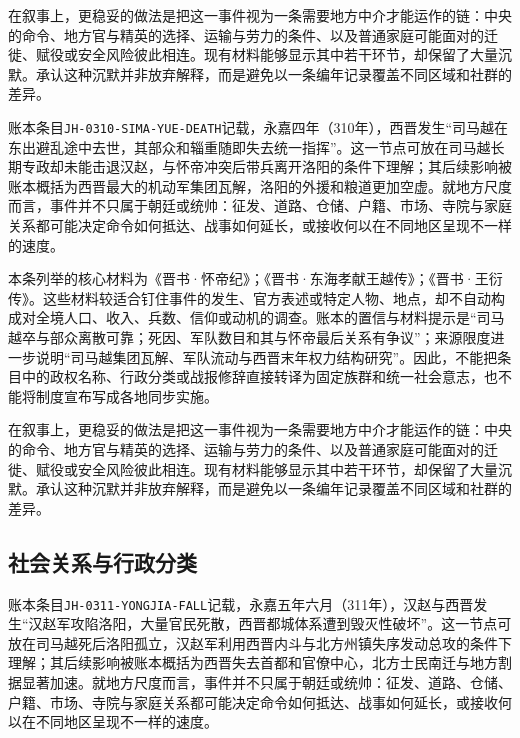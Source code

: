 在叙事上，更稳妥的做法是把这一事件视为一条需要地方中介才能运作的链：中央的命令、地方官与精英的选择、运输与劳力的条件、以及普通家庭可能面对的迁徙、赋役或安全风险彼此相连。现有材料能够显示其中若干环节，却保留了大量沉默。承认这种沉默并非放弃解释，而是避免以一条编年记录覆盖不同区域和社群的差异。

账本条目\texttt{JH-0310-SIMA-YUE-DEATH}记载，永嘉四年（310年），西晋发生“司马越在东出避乱途中去世，其部众和辎重随即失去统一指挥”。这一节点可放在司马越长期专政却未能击退汉赵，与怀帝冲突后带兵离开洛阳的条件下理解；其后续影响被账本概括为西晋最大的机动军集团瓦解，洛阳的外援和粮道更加空虚。就地方尺度而言，事件并不只属于朝廷或统帅：征发、道路、仓储、户籍、市场、寺院与家庭关系都可能决定命令如何抵达、战事如何延长，或接收何以在不同地区呈现不一样的速度。

本条列举的核心材料为《晋书·怀帝纪》；《晋书·东海孝献王越传》；《晋书·王衍传》。这些材料较适合钉住事件的发生、官方表述或特定人物、地点，却不自动构成对全境人口、收入、兵数、信仰或动机的调查。账本的置信与材料提示是“司马越卒与部众离散可靠；死因、军队数目和其与怀帝最后关系有争议”；来源限度进一步说明“司马越集团瓦解、军队流动与西晋末年权力结构研究”。因此，不能把条目中的政权名称、行政分类或战报修辞直接转译为固定族群和统一社会意志，也不能将制度宣布写成各地同步实施。

在叙事上，更稳妥的做法是把这一事件视为一条需要地方中介才能运作的链：中央的命令、地方官与精英的选择、运输与劳力的条件、以及普通家庭可能面对的迁徙、赋役或安全风险彼此相连。现有材料能够显示其中若干环节，却保留了大量沉默。承认这种沉默并非放弃解释，而是避免以一条编年记录覆盖不同区域和社群的差异。

\subsection{社会关系与行政分类}

账本条目\texttt{JH-0311-YONGJIA-FALL}记载，永嘉五年六月（311年），汉赵与西晋发生“汉赵军攻陷洛阳，大量官民死散，西晋都城体系遭到毁灭性破坏”。这一节点可放在司马越死后洛阳孤立，汉赵军利用西晋内斗与北方州镇失序发动总攻的条件下理解；其后续影响被账本概括为西晋失去首都和官僚中心，北方士民南迁与地方割据显著加速。就地方尺度而言，事件并不只属于朝廷或统帅：征发、道路、仓储、户籍、市场、寺院与家庭关系都可能决定命令如何抵达、战事如何延长，或接收何以在不同地区呈现不一样的速度。

